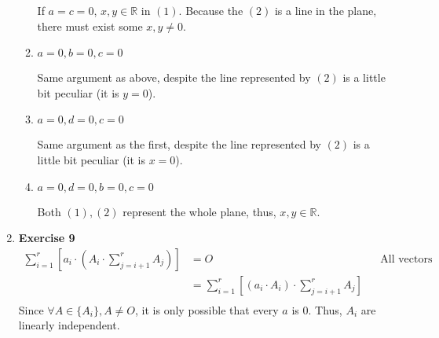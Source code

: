 \documentclass[11pt]{article}
\begin{document}
\begin{enumerate}
\begin{enumerate}
If \(a=c=0\), \(x,y\in \mathbb{R}\) in \((1)\). Because the \((2)\) is a line in the plane, there must exist some \(x,y\not = 0\).
\item \(a=0,b=0,c=0\)
\label{sec:orgfc98c1d}

Same argument as above, despite the line represented by \((2)\) is a little bit peculiar (it is \(y=0\)).
\item \(a=0,d=0,c=0\)
\label{sec:org3e319bb}

Same argument as the first, despite the line represented by \((2)\) is a little bit peculiar (it is \(x=0\)).
\item \(a=0,d=0,b=0,c=0\)
\label{sec:org3e537d8}

Both \((1), (2)\) represent the whole plane, thus, \(x,y\in \mathbb{R}\).
\end{enumerate}
\item \textbf{Exercise 9}
\label{sec:orgec7034a}
$$\begin{aligned}
\sum\limits_{i=1}^{r} [a_i\cdot (A_i\cdot \sum\limits_{j=i+1}^{r}A_{j})]&=O && \text{All vectors are mutually perpendicular}\\
&=\sum\limits_{i=1}^{r} [(a_i\cdot A_i)\cdot \sum\limits_{j=i+1}^{r}A_{j}]\\
\end{aligned}$$
Since \(\forall A\in \{A_i\}, A\not = O\), it is only possible that every \(a\) is \(0\). Thus, \({A_i}\) are linearly independent.
\end{enumerate}
\end{document}
